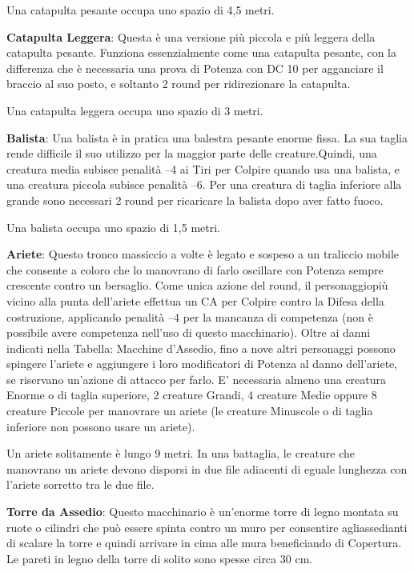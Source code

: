 \documentclass[a4paper,11pt,twoside,openany]{book}
\begin{document}
Una catapulta pesante occupa uno spazio di 4,5 metri.

\textbf{Catapulta Leggera}: Questa è una versione più piccola e più leggera della catapulta pesante. Funziona essenzialmente come una catapulta pesante, con la differenza che è necessaria una prova di Potenza con DC 10 per agganciare il braccio al suo posto, e soltanto 2 round per ridirezionare la catapulta.

Una catapulta leggera occupa uno spazio di 3 metri.

\textbf{Balista}: Una balista è in pratica una balestra pesante enorme fissa. La sua taglia rende difficile il suo utilizzo per la maggior parte delle creature.Quindi, una creatura media subisce penalità --4 ai Tiri per Colpire quando usa una balista, e una creatura piccola subisce penalità --6. Per una creatura di taglia inferiore alla grande sono necessari 2 round per ricaricare la balista dopo aver fatto fuoco.

Una balista occupa uno spazio di 1,5 metri.

\textbf{Ariete}: Questo tronco massiccio a volte è legato e sospeso a un traliccio mobile che consente a coloro che lo manovrano di farlo oscillare con Potenza sempre crescente contro un bersaglio. Come unica azione del round, il personaggiopiù vicino alla punta dell'ariete effettua un CA per Colpire contro la Difesa della costruzione, applicando penalità --4 per la mancanza di competenza (non è possibile avere competenza nell'uso di questo macchinario). Oltre ai danni indicati nella Tabella: Macchine d'Assedio, fino a nove altri personaggi possono spingere l'ariete e aggiungere i loro modificatori di Potenza al danno dell'ariete, se riservano un'azione di attacco per farlo. E' necessaria almeno una creatura Enorme o di taglia superiore, 2 creature Grandi, 4 creature Medie oppure 8 creature Piccole per manovrare un ariete (le creature Minuscole o di taglia inferiore non possono usare un ariete).

Un ariete solitamente è lungo 9 metri. In una battaglia, le creature che manovrano un ariete devono disporsi in due file adiacenti di eguale lunghezza con l'ariete sorretto tra le due file.

\textbf{Torre da Assedio}: Questo macchinario è un'enorme torre di legno montata su ruote o cilindri che può essere spinta contro un muro per consentire agliassedianti di scalare la torre e quindi arrivare in cima alle mura beneficiando di Copertura. Le pareti in legno della torre di solito sono spesse circa 30 cm.
\end{document}
